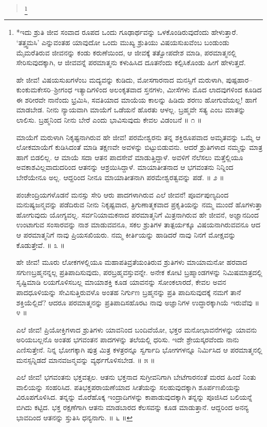 \begin{verse}
\footnote{*ಇದು ಶ್ರುತಿ ಜೀವ ಸಂವಾದ ರೂಪದ ಒಂದು ಗೂಢಾರ್ಥವನ್ನು ಒಳಕೊಂಡಿರುವುದೆಂದು ಹೇಳುತ್ತಾರೆ. ‘ತತ್ತ್ವಮಸಿ’ ಎನ್ನುವಂತಹ ಯಾವುದೋ ಒಂದು ಮುಖ್ಯ ಶ್ರುತಿಯು ವಿಷಯಸುಖವೆಂಬ ಬಂಡುಂಡು ಮೈಮರೆತಿರುವ ಜೀವನನ್ನು ಕಂಡು ಕರುಣೆಯಿಂದ, ಆ ಜೀವಕ್ಕೆ ತತ್ವೋಪದೇಶ ಮಾಡಿ, ಪರಮಾತ್ಮನಲ್ಲಿ ಸೇರಿಸುವುದಕ್ಕಾಗಿ, ಆ ಜೀವವನ್ನೆ ಪರಮಾತ್ಮನು ಕಳುಹಿಸಿದ ದೂತನೆಂದು ಕಲ್ಪಿಸಿಕೊಂಡು ಹೀಗೆ ಹೇಳುತ್ತದೆ.

ಹೇ ಜೀವ! ವಿಷಯಸುಖಗಳೆಂಬ ಮದ್ಯವನ್ನು ಕುಡಿದು, ಮೋಸಗಾರನಾದ ಮನಸ್ಸಿಗೆ ಮರುಳಾಗಿ, ಪುಷ್ಪಹಾರ–ಕುಂಕುಮಕೇಸರಿ–ಶ್ರೀಗಂಧ ಇತ್ಯಾದಿಗಳಿಂದ ಅಲಂಕೃತವಾದ ಸ್ತನಗಳು, ಮೀಸೆಗಳು ಮೊದ ಲಾದವುಗಳಿಂದ ಕೂಡಿದ ಈ ಶರೀರವೇ ನಾನೆಂದು ಭ್ರಮಿಸಿ, ಸವತಿಯಾದ ಮಾಯೆಯ ಕಾಲನ್ನು ಹಿಡಿದು ಶರಣು ಹೋಗುವೆಯಲ್ಲ! ಹಾಗೆ ಮಾಡಬೇಡ. ನೀನು ನ್ಯಾಯವಾಗಿ ಮಾಯೆಗೆ ಒಡೆಯನೆ ಹೊರತು ಆಳಲ್ಲ. ಬ್ರಹ್ಮವೇ ಸತ್ಯ ಎಂಬ ಮಾತನ್ನು ಲಾಲಿಸು. ಬ್ರಹ್ಮನಿಂದ ನೀನು ಬೇರೆ ಎಂದು ಭಾವಿಸುವುದು ಕೇವಲ ವಿಡಂಬನೆ \num{॥ ೧ ॥}

ಮಾಯೆಗೆ ಮರುಳಾಗಿ ನಿಕೃಷ್ಟನಾಗಿರುವ ಹೇ ಜೀವ! ಪರಮೇಶ್ವರನು ತನ್ನ ಶಕ್ತಿರೂಪವಾದ ಅಮೃತವನ್ನು ಒಮ್ಮೆ ಆ ಲೋಕಮಾಯೆಗೆ ಕುಡಿಸಿದಂತೆ ಮಾಡಿ ತಕ್ಷಣವೇ ಅವಳನ್ನು ಬಿಟ್ಟುಬಿಡುವನು. ಆದರೆ ಶ್ರುತಿಗಳಾದ ನಮ್ಮನ್ನು ಮಾತ್ರ ಹಾಗೆ ಬಿಡಲಿಲ್ಲ. ಆ ಮಾಯೆ ಸದಾ ಆತನ ಪಾದಸೇವೆ ಮಾಡುತ್ತಿದ್ದಾಳೆ. ಅವಳಿಗೆ ನೆಲೆಸಲು ಮತ್ತೆಲ್ಲಿಯೂ ಅವಕಾಶವಿಲ್ಲವಾದುದರಿಂದ ಆತನನ್ನು ಆಶ್ರಯಿಸಿದ್ದಾಳೆ. ಮಾಯಾತೀತನಾದ ಆ ಭಗವಂತನು ನಿನ್ನಿಂದ ಬೇರೆಯೇನೂ ಅಲ್ಲ. ಆದ್ದರಿಂದ ನೀನೂ ಮಾಯಾತೀತನಾಗಿ ಪರಮೇಶ್ವರತ್ವವನ್ನು ಪಡೆ. \num{॥ ೨ ॥}

ಪಂಚೇಂದ್ರಿಯಗಳೊಡನೆ ಮನಸ್ಸು ಸೇರಿ ಆರು ಪಾದಗಳಾಗಿರುವ ಎಲೆ ಜೀವನೆ! ಪೂರ್ವಪುಣ್ಯದಿಂದ ಮನುಷ್ಯಜನ್ಮವನ್ನು ಪಡೆದಿರುವ ನೀನು ನಿಕೃಷ್ಟವಾದ, ತ್ರಿಗುಣಾತ್ಮಕವಾದ ಪ್ರಕೃತಿಯನ್ನು ನಮ್ಮ ಮುಂದೆ ಹೊಗಳುತ್ತಾ ಹೋಗುವುದು ಯೋಗ್ಯವಲ್ಲ. ಸರ್ವನಿಯಾಮಕನಾದ ಪರಮಾತ್ಮನಿಗೆ ಮಿತ್ರನಾಗಿರುವ ಹೇ ಜೀವನೆ, ಅಜ್ಞಾನದಿಂದ ಉಂಟಾಗುವ ಸಂಸಾರವನ್ನು ನಾಶ ಮಾಡುವವನೂ, ಸಕಲ ಶ್ರುತಿಗಳ ತಾತ್ಪರ್ಯಕ್ಕೂ ವಿಷಯನಾಗಿರುವವನೂ ಆದ ಆ ಪರಮಾತ್ಮನಿಗೆ ನಾವು ಪ್ರಿಯಸಖಿಯರು. ನಮ್ಮ ಕೀರ್ತಿಯನ್ನು ಹಾಡಿದರೆ ನಾವು ನಿನಗೆ ಮೋಕ್ಷವನ್ನು ಕೊಡುತ್ತೇವೆ. \num{॥ ೩ ॥}

ಹೇ ಜೀವ! ಮೂರು ಲೋಕಗಳಲ್ಲಿಯೂ ಮಹಾಪತಿವ್ರತೆಯಂತಿರುವ ಶ್ರುತಿಗಳು ಮಾಯಾಮನೋ ಹರವಾದ ಸಗುಣಬ್ರಹ್ಮನನ್ನಲ್ಲ ಪ್ರತಿಪಾದಿಸುವುದು, ಪರಬ್ರಹ್ಮವಸ್ತುವನ್ನೇ. ಅನೇಕ ಕೋಟಿ ಬ್ರಹ್ಮಾಂಡಗಳನ್ನು ನಿಮಿಷಮಾತ್ರದಲ್ಲಿ ಸೃಷ್ಟಿಮಾಡಿ ಲಯಗೊಳಿಸಬಲ್ಲ ಮಾಯಾಶಕ್ತಿ ಕೂಡ ಯಾವನನ್ನು ಸೋಂಕಲಾರದೆ, ಕೇವಲ ಅವನ ಪಾದಧೂಳಿಯನ್ನು ಸೇವಿಸುತ್ತಿರುವಳೊ ಅಂತಹ ನಿರ್ಗುಣ ಬ್ರಹ್ಮನನ್ನು ಪ್ರತಿ ಪಾದಿಸುವುದಕ್ಕೆ ನಮಗೆ ತಾನೆ ಶಕ್ತಿಯೆಲ್ಲಿದೆ? ಆದರೂ ಪರಮಾತ್ಮನನ್ನು ಪ್ರತಿಪಾದಿಸಹೊರಟ ನಾವು ಅಜ್ಞಾನಿಗಳ ಉದ್ಧಾರಕ್ಕಾಗಿಯೆ ಇರುವೆವು \num{॥ ೪ ॥}

ಎಲೆ ಜೀವ! ಪ್ರಿಯೋಕ್ತಿಗಳಾದ ಶ್ರುತಿಗಳು ಯಾವನಿಂದ ಬಂದಿವೆಯೋ, ಭಕ್ತರ ಮನೋಭಾವನೆಗಳನ್ನು ಯಾವನು ಅರಿಯಬಲ್ಲನೊ ಅಂತಹ ಭಗವಂತನ ಪಾದಗಳನ್ನು ತಲೆಯಲ್ಲಿ ಧರಿಸು. ಇದೇ ಶ್ರೇಯಸ್ಕರವೆಂದು ನಾನು ಎಣಿಸುತ್ತೇನೆ. ನಿನ್ನ ಭೋಗಕ್ಕಾಗಿ ಪುತ್ರ ಮಿತ್ರ ಕಳತ್ರರನ್ನೂ ಸ್ವರ್ಗಾದಿ ಭೋಗಗಳನ್ನೂ ನಿರ್ಮಿಸಿದ ಆ ಪರಮಾತ್ಮನಲ್ಲಿ ಮನಸ್ಸನ್ನಿಡದೆ ಮಾನವಜನ್ಮವನ್ನು ವ್ಯರ್ಥಗೊಳಿಸಬೇಡ. \num{॥ ೫ ॥ }

ಎಲೆ ಜೀವ! ಭಗವಂತನು ಭಕ್ತವತ್ಸಲ. ಆತನು ಭಕ್ತನಾದ ಸುಗ್ರೀವನಿಗಾಗಿ ಬೇಟೆಗಾರನಂತೆ ಮರದ ಹಿಂದೆ ನಿಂತು ವಾಲಿಯನ್ನು ಸಂಹರಿಸಿದ. ಪತಿಭಕ್ತಪರಾಯಣೆಯಾದ ಸೀತೆಯನ್ನು ಸಲಹುವುದಕ್ಕಾಗಿ ಶೂರ್ಪಣಖಿಯನ್ನು ವಿರೂಪಗೊಳಿಸಿದ. ತನ್ನನ್ನು ಮೊರೆಹೊಕ್ಕ ಇಂದ್ರಾದಿಗಳನ್ನು ಕಾಪಾಡುವುದಕ್ಕಾಗಿ ತನ್ನನ್ನು ಪೂಜಿಸಿದ ಬಲಿಯನ್ನೆ ಬಿಗಿದು ಕಟ್ಟಿದ. ಭಕ್ತ ರಕ್ಷಣೆಗಾಗಿ ಆತನು ಮಾಡಬಾರದ ಕೆಲಸವನ್ನು ಕೂಡ ಮಾಡುತ್ತಾನೆ. ಆದ್ದರಿಂದ ಅನನ್ಯ ಭಾವದಿಂದ ಆತನನ್ನು ಸ್ತುತಿಸಿ ಧನ್ಯನಾಗು. \num{॥ ೬ ॥}

}
\end{verse}
